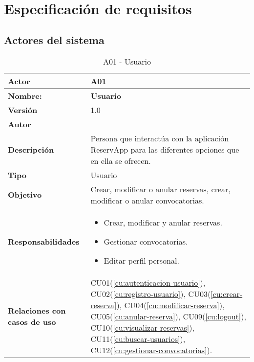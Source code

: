 \newpage
\section{Especificación de requisitos}

\subsection{Actores del sistema}

\begin{table}[H]
	\centering
	\begin{tabularx}{\linewidth}{ p{} p{} }
		\toprule
		\textbf{Actor}    & A01 \\
		\toprule
		\textbf{Nombre:} 			  & \textbf{Usuario} \\
		\textbf{Versión}              & 1.0    \\
		\textbf{Autor}                & \nombre \\
		\textbf{Descripción}          & Persona que interactúa con la aplicación ReservApp para las diferentes opciones que en ella se ofrecen. \\
		\textbf{Tipo}                 & Usuario \\
		\textbf{Objetivo}             & Crear, modificar o anular reservas, crear, modificar o anular convocatorias. \\
		\textbf{Responsabilidades}    & 
		\begin{itemize}
			\tightlist
			\item Crear, modificar y anular reservas.
			\item Gestionar convocatorias.
			\item Editar perfil personal.
		\end{itemize}\\
		\textbf{Relaciones con casos de uso} & CU01(\ref{cu:autenticacion-usuario}), CU02(\ref{cu:registro-usuario}), CU03(\ref{cu:crear-reserva}), CU04(\ref{cu:modificar-reserva}), CU05(\ref{cu:anular-reserva}), CU09(\ref{cu:logout}), CU10(\ref{cu:visualizar-reservas}), CU11(\ref{cu:buscar-usuarios}), CU12(\ref{cu:gestionar-convocatorias}). \\
		\bottomrule
	\end{tabularx}
	\caption{A01 - Usuario}
	\label{actor:usuario}
\end{table}


